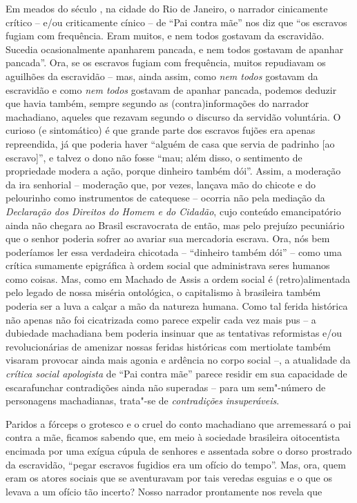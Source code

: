 Em meados do século , na cidade do Rio de Janeiro, o narrador
cinicamente crítico -- e/ou criticamente cínico -- de ``Pai contra mãe''
nos diz que ``os escravos fugiam com frequência. Eram muitos, e nem
todos gostavam da escravidão. Sucedia ocasionalmente apanharem pancada,
e nem todos gostavam de apanhar pancada''. Ora, se os escravos fugiam
com frequência, muitos repudiavam os aguilhões da escravidão -- mas,
ainda assim, como \emph{nem todos} gostavam da escravidão e como
\emph{nem todos} gostavam de apanhar pancada, podemos deduzir que havia
também, sempre segundo as (contra)informações do narrador machadiano,
aqueles que rezavam segundo o discurso da servidão voluntária. O curioso
(e sintomático) é que grande parte dos escravos fujões era apenas
repreendida, já que poderia haver ``alguém de casa que servia de
padrinho {[}ao escravo{]}'', e talvez o dono não fosse ``mau; além
disso, o sentimento de propriedade modera a ação, porque dinheiro também
dói''. Assim, a moderação da ira senhorial -- moderação que, por vezes,
lançava mão do chicote e do pelourinho como instrumentos de catequese --
ocorria não pela mediação da \emph{Declaração dos Direitos do Homem e do
Cidadão}, cujo conteúdo emancipatório ainda não chegara ao Brasil
escravocrata de então, mas pelo prejuízo pecuniário que o senhor poderia
sofrer ao avariar sua mercadoria escrava. Ora, nós bem poderíamos ler
essa verdadeira chicotada -- ``dinheiro também dói'' -- como uma crítica
sumamente epigráfica à ordem social que administrava seres humanos como
coisas. Mas, como em Machado de Assis a ordem social é (retro)alimentada
pelo legado de nossa miséria ontológica, o capitalismo à brasileira
também poderia ser a luva a calçar a mão da natureza humana. Como tal
ferida histórica não apenas não foi cicatrizada como parece expelir cada
vez mais pus -- a dubiedade machadiana bem poderia insinuar que as
tentativas reformistas e/ou revolucionárias de amenizar nossas feridas
históricas com mertiolate também visaram provocar ainda mais agonia e
ardência no corpo social --, a atualidade da \emph{crítica social
apologista} de ``Pai contra mãe'' parece residir em sua capacidade de
escarafunchar contradições ainda não superadas -- para um sem"-número de
personagens machadianas, trata"-se de \emph{contradições}
\emph{insuperáveis}.

Paridos a fórceps o grotesco e o cruel do conto machadiano que
arremessará o pai contra a mãe, ficamos sabendo que, em meio à sociedade
brasileira oitocentista encimada por uma exígua cúpula de senhores e
assentada sobre o dorso prostrado da escravidão, ``pegar escravos
fugidios era um ofício do tempo''. Mas, ora, quem eram os atores sociais
que se aventuravam por tais veredas esguias e o que os levava a um
ofício tão incerto? Nosso narrador prontamente nos revela que

